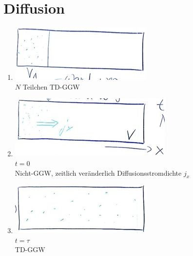 \section{Diffusion}
\begin{enumerate}
	\item \includegraphics{Bild120} \\
		$N$ Teilchen TD-GGW
	\item \includegraphics{Bild121} \\
		$t = 0$ \\
		Nicht-GGW, zeitlich veränderlich Diffusionsstromdichte $j_x$
	\item \includegraphics{Bild122} \\
		$t = \tau$ \\
		TD-GGW
\end{enumerate}


